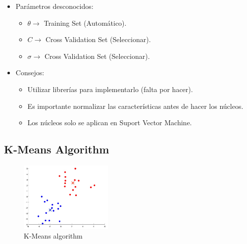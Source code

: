 \documentclass[12pt,a4paper]{article}
\begin{document}
\begin{itemize}
\item Parámetros desconocidos:
\begin{itemize}
\item $\theta \longrightarrow$ Training Set (Automático).
\item $C \longrightarrow$ Cross Validation Set (Seleccionar).
\item $\sigma \longrightarrow$ Cross Validation Set (Seleccionar).
\end{itemize}

\item Consejos:
\begin{itemize}
\item Utilizar librerías para implementarlo (falta por hacer).
\item Es importante normalizar las características antes de hacer los núcleos.
\item Los núcleos solo se aplican en Suport Vector Machine.
\end{itemize}
\end{itemize}


\newpage

\subsection{K-Means Algorithm}
\begin{figure}[htb]
\center
\includegraphics[width=0.4\textwidth]{k_means}
\caption{K-Means algorithm}
\end{figure}
\end{document}
